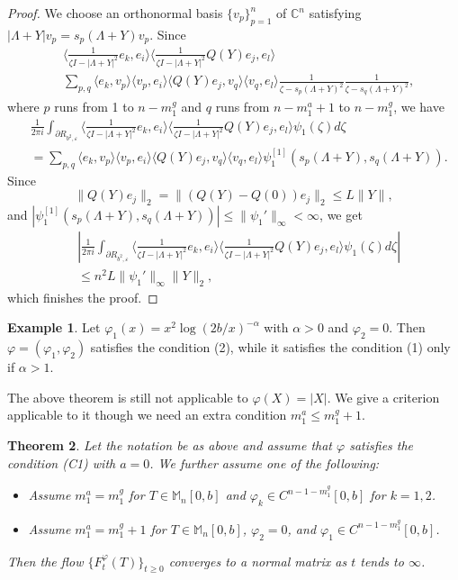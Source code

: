 \documentclass[12pt]{article}
\newtheorem{theorem}{Theorem}[section]
\theoremstyle{definition}
\newtheorem{example}[theorem]{Example}
\numberwithin{equation}{section}
\newcommand{\C}{\mathbb{C}}
\newcommand{\M}{\mathbb{M}}
\newcommand{\inpr}[2]{\langle{#1,#2}\rangle}
\begin{document}
\begin{proof}
We choose an orthonormal basis $\{v_p\}_{p=1}^n$ of $\C^n$ satisfying $|\Lambda+Y|v_p=s_p(\Lambda+Y)v_p$. 
Since 
\begin{align*}
	&\inpr{\frac{1}{\zeta I-|\Lambda+Y|^2} e_k}{e_i}\inpr{\frac{1}{\zeta I-|\Lambda+Y|^2}Q(Y)e_j}{e_l} \\
	&\sum_{p,q}\inpr{e_k}{v_p}\inpr{v_p}{e_i}
	\inpr{Q(Y)e_j}{v_q}\inpr{v_q}{e_l}\frac{1}{\zeta-s_p(\Lambda+Y)^2}\frac{1}{\zeta-s_q(\Lambda+Y)^2},
\end{align*}
where $p$ runs from 1 to $n-m^g_1$ and $q$ runs from $n-m^a_1+1$ to $n-m^g_1$, we have 
\begin{align*}
	 &\frac{1}{2\pi i}\int_{\partial R_{b^2,\varepsilon}} \inpr{\frac{1}{\zeta I-|\Lambda+Y|^2} e_k}{e_i}\inpr{\frac{1}{\zeta I-|\Lambda+Y|^2}Q(Y)e_j}{e_l}	\psi_1(\zeta)d\zeta  \\
	&= \sum_{p,q}\inpr{e_k}{v_p}\inpr{v_p}{e_i}
	\inpr{Q(Y)e_j}{v_q}\inpr{v_q}{e_l}\psi_1^{[1]}(s_p(\Lambda+Y),s_q(\Lambda+Y)).
\end{align*} 
Since 
\[\|Q(Y)e_j\|_2=\|(Q(Y)-Q(0))e_j\|_2\leq L\|Y\|,\] 
and $|\psi_1^{[1]}(s_p(\Lambda+Y),s_q(\Lambda+Y))|\leq \|\psi_1'\|_\infty<\infty$, we get 
\begin{align*}
	&|\frac{1}{2\pi i}\int_{\partial R_{b^2,\varepsilon}} \inpr{\frac{1}{\zeta I-|\Lambda+Y|^2} e_k}{e_i}\inpr{\frac{1}{\zeta I-|\Lambda+Y|^2}Q(Y)e_j}{e_l}	\psi_1(\zeta)d\zeta|  \\
	&\leq  n^2L \|\psi_1'\|_\infty \|Y\|_2,
\end{align*} 
which finishes the proof. 
\end{proof}

\begin{example} Let $\varphi_1(x)=x^2\log(2b/x)^{-\alpha}$ with $\alpha>0$ and $\varphi_2=0$. 
Then $\varphi=(\varphi_1,\varphi_2)$ satisfies the condition (2), while it satisfies the condition (1) 
only if $\alpha>1$. 
\end{example}

The above theorem is still not applicable to $\varphi(X)=|X|$. 
We give a criterion applicable to it though we need an extra condition $m^a_1\leq m^g_1+1$. 

\begin{theorem}\label{noninvertible} Let the notation be as above and assume that $\varphi$ satisfies the condition (C1) 
with $a=0$. 
We further assume one of the following:
\begin{itemize}
	\item [$(1)$] Assume $m^a_1=m^g_1$ for $T\in \M_n[0,b]$ and $\varphi_k\in C^{n-1-m^g_1}[0,b]$ for $k=1,2$. 
	\item [$(2)$] Assume $m^a_1=m^g_1+1$ for $T\in \M_n[0,b]$, $\varphi_2=0$, and $\varphi_1\in C^{n-1-m^g_1}[0,b]$. 
\end{itemize}
Then the flow $\{F^\varphi_t(T)\}_{t\geq 0}$ converges to a normal matrix 
as $t$ tends to $\infty$.  
\end{theorem}
\end{document}
